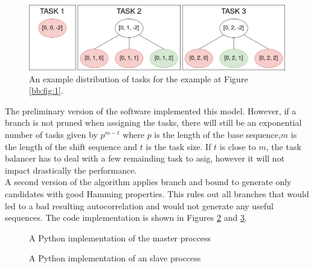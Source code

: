   \begin{figure}[ht!]
    \begin{center}
      \includegraphics[scale=0.4]{Chapters/Implementation/Example_tasks.png}
    \end{center}
    \caption{An example distribution of tasks for the example at Figure
    \ref{bb:fig:1}.}
    \label{tasks:fig:1}
  \end{figure}

  The preliminary version of the software implemented this model.  However, if a branch is not pruned when assigning the tasks, there will still be an exponential number of tasks
 given by $p^{m-t}$ where $p$ is the length of the base sequence,$m$ is the
  length of the shift sequence  and $t$ is the task size.  If $t$ is close to $m$, the task balancer has to deal with a few remainding  task to asig, however it will not impact drastically the performance.\\

  A second version of the algorithm applies branch and bound to generate only candidates with good Hamming properties.
  This rules out all branches that would led to a bad resulting autocorrelation and would not generate any useful sequences. The code
  implementation is shown in Figures \ref{parallelism_example:fig:1} and
  \ref{parallelism_example:fig:2}.\\

  \begin{figure}[ht!]
    \caption{A Python implementation of the master proccess}
    \label{parallelism_example:fig:1}
  \end{figure}

  \begin{figure}[ht!]
    \caption{A Python implementation of an slave proccess}
    \label{parallelism_example:fig:2}
  \end{figure}
